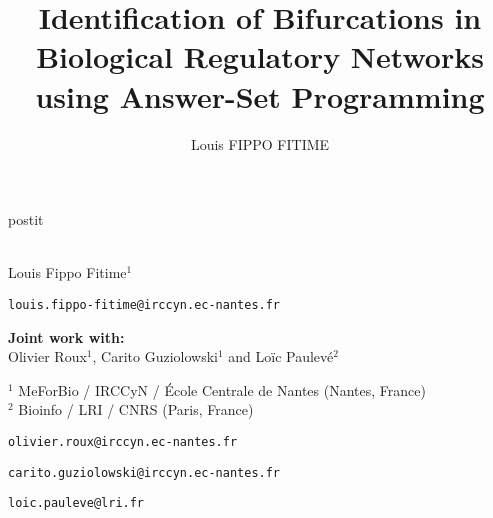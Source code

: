 \documentclass[fleqn,10pt,c]{beamer}
\date{\thedate}
\title[]{Identification of Bifurcations in Biological
Regulatory Networks using Answer-Set
Programming}
\author{Louis FIPPO FITIME}
\newcommand{\ex}[1]{\textcolor{couleurex}{#1}}
\newcommand{\tcite}[1]{\textcolor{couleurcit}{[#1]}}
\newcommand{\tval}[1]{\textcolor{couleurex}{#1}}%
\begin{document}
\begin{frame}[plain,label=title]

\begin{center}
\vspace{1cm}
\begin{beamercolorbox}[sep=0.5em]{postit}
\centering
\Large
\textbf{%
{\normalsize\theconference{}}\\~\\%
\inserttitle
}
\end{beamercolorbox}

\par
\medskip
\normalsize
Louis Fippo Fitime$^{1}$
\footnotesize

\texttt{louis.fippo-fitime@irccyn.ec-nantes.fr}


\normalsize
\bigskip
\textbf{Joint work with:} \\  Olivier Roux$^1$, Carito Guziolowski$^1$ and Lo\"ic Paulev\'e$^2$

\medskip
\footnotesize
$^1$ MeForBio / IRCCyN / École Centrale de Nantes (Nantes, France)\\
$^2$ Bioinfo / LRI / CNRS (Paris, France)

\texttt{olivier.roux@irccyn.ec-nantes.fr}

\texttt{carito.guziolowski@irccyn.ec-nantes.fr}

\texttt{loic.pauleve@lri.fr}

\end{center}

\end{frame}





\newcommand{\citeegfra}{\quad\tval{\ex{egfr20}}: \tcite{Epidermal Growth Factor Receptor, by Özgür Sahin \textit{et al.}}}
\newcommand{\citeegfrb}{\quad\tval{\ex{egfr104}}: \tcite{Epidermal Growth Factor Receptor, by Regina Samaga \textit{et al.}}}
\newcommand{\citetcrsiga}{\quad\tval{\ex{tcrsig40}}: \tcite{T-Cell Receptor Signaling, by Steffen Klamt \textit{et al.}}}
\newcommand{\citetcrsigb}{\quad\tval{\ex{tcrsig94}}: \tcite{T-Cell Receptor Signaling, by Julio Saez-Rodriguez \textit{et al.}}}

\newcommand{\citemodels}{\bigskip\citeegfra\\\citeegfrb\\\citetcrsiga\\\citetcrsigb}
\end{document}
